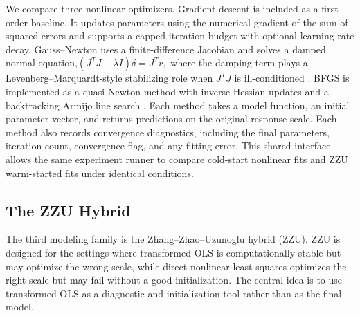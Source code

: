 \documentclass[11pt]{article}
\begin{document}
We compare three nonlinear optimizers. Gradient descent is included as a first-order baseline. It updates parameters using the numerical gradient of the sum of squared errors and supports a capped iteration budget with optional learning-rate decay. Gauss--Newton uses a finite-difference Jacobian and solves a damped normal equation,$(J^T J + \lambda I)\delta = J^T r,$
where the damping term plays a Levenberg--Marquardt-style stabilizing role when \(J^T J\) is ill-conditioned \cite{Levenberg1944,Marquardt1963,BatesWatts1988}. BFGS is implemented as a quasi-Newton method with inverse-Hessian updates and a backtracking Armijo line search \cite{Broyden1970,Fletcher1970,Goldfarb1970,Shanno1970,NocedalWright2006}. Each method takes a model function, an initial parameter vector, and returns predictions on the original response scale. Each method also records convergence diagnostics, including the final parameters, iteration count, convergence flag, and any fitting error. This shared interface allows the same experiment runner to compare cold-start nonlinear fits and ZZU warm-started fits under identical conditions.

\subsection{The ZZU Hybrid}
The third modeling family is the Zhang--Zhao--Uzunoglu hybrid (ZZU). ZZU is designed for the settings where transformed OLS is computationally stable but may optimize the wrong scale, while direct nonlinear least squares optimizes the right scale but may fail without a good initialization. The central idea is to use transformed OLS as a diagnostic and initialization tool rather than as the final model.
\end{document}
